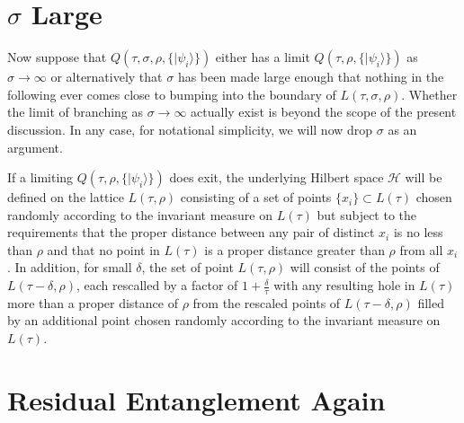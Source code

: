 \documentclass[twocolumn,amsmath,amssymb]{revtex4-1}
\begin{document}
\section{\label{subsec:sigmainfty} $\sigma$ Large}

Now suppose that $Q(\tau, \sigma, \rho, \{|\psi_i \rangle \})$
either has a limit $Q(\tau, \rho, \{|\psi_i \rangle \})$
as $\sigma \rightarrow \infty$ or alternatively
that $\sigma$ has been made large enough that nothing
in the following ever comes close to bumping into
the boundary of $L( \tau, \sigma, \rho)$.
Whether the limit of branching
as $\sigma \rightarrow \infty$ actually exist is beyond
the scope of the present discussion.
In any case, for notational simplicity, we will now drop $\sigma$
as an argument.

If a limiting $Q(\tau, \rho, \{|\psi_i \rangle \})$ does exit,
the underlying Hilbert space $\mathcal{H}$  will be defined
on the lattice $L( \tau, \rho)$  consisting
of a set of points $\{ x_i \} \subset L(\tau)$ chosen randomly
according to the invariant measure on $L(\tau)$
but subject
to the requirements that the proper distance between
any pair of distinct $x_i$ is no less than $\rho$ and
that no point in $L(\tau)$ is a proper distance greater than
$\rho$ from all $x_i$. In addition, for small $\delta$, the set of point
$L( \tau, \rho)$ will consist of the points of
$L( \tau - \delta, \rho)$, each rescalled by a
factor of $1 + \frac{\delta}{\tau}$ with any
resulting hole in $L(\tau)$ more than a
proper distance of $\rho$ from the rescaled
points of $L( \tau - \delta, \rho)$ 
filled by an additional point chosen randomly
according to the invariant measure on $L(\tau)$.


\section{\label{sec:residualagain} Residual Entanglement Again}
\end{document}
